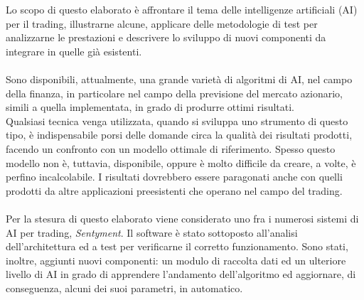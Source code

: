 \documentclass[a4paper,12pt]{report}
\begin{document}
%
% 
% 
%
%
Lo scopo di questo elaborato è affrontare il tema delle intelligenze artificiali (AI) per il trading, illustrarne alcune, applicare delle metodologie di test per analizzarne le prestazioni e descrivere lo sviluppo di nuovi componenti da integrare in quelle già esistenti.
\\~\\
Sono disponibili, attualmente, una grande varietà di algoritmi di AI, nel campo della finanza, in particolare nel campo della previsione del mercato azionario, simili a quella implementata, in grado di produrre ottimi risultati.\\Qualsiasi tecnica venga utilizzata, quando si sviluppa uno strumento di questo tipo, è indispensabile porsi delle domande circa la qualità dei risultati prodotti, facendo un confronto con un modello ottimale di riferimento. Spesso questo modello non è, tuttavia, disponibile, oppure è molto difficile da creare, a volte, è perfino incalcolabile. I risultati dovrebbero essere paragonati anche con quelli prodotti da altre applicazioni preesistenti che operano nel campo del trading.\\~\\
Per la stesura di questo elaborato viene considerato uno fra i numerosi sistemi di AI per trading, \textit{Sentyment}. Il software è stato sottoposto all'analisi dell'architettura ed a test per verificarne il corretto funzionamento. Sono stati, inoltre, aggiunti nuovi componenti: un modulo di raccolta dati ed un ulteriore livello di AI in grado di apprendere l'andamento dell'algoritmo ed aggiornare, di conseguenza, alcuni dei suoi parametri, in automatico.
\afterpreface
\end{document}
